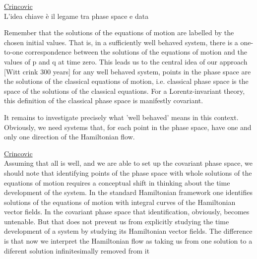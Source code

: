 \documentclass[Main]{subfiles}
\begin{document}
		\begin{Warning}
			\underline{Crincovic}\cite{Crnkovic1999}\\
			L'idea chiave è il legame tra phase space e data
			
			Remember that the solutions of the equations of motion are labelled by the chosen initial values. 
			That is, in a sufficiently well behaved system, there is a one-to-one correspondence between the solutions of the equations of motion and the values of p and q at time zero. 
			This leads us to the central idea of our approach [Witt crink 300 years] for any well behaved system, points in the phase space are the solutions of the classical equations of motion, i.e. classical phase space is the space of the solutions of the classical equations. For a Lorentz-invariant theory, this definition of the classical phase space is manifestly covariant.		
			
			It remains to investigate precisely what 'well behaved' means in this context.
			Obviously, we need systems that, for each point in the phase space, have one and only one direction of the Hamiltonian flow.
		\end{Warning}	
		
		\begin{Warning}
		\underline{Crincovic}\cite{Crnkovic1999}\\
		Assuming that all is well, and we are able to set up the covariant phase space, we should note that identifying points of the phase space with whole solutions of the equations of motion requires a conceptual shift in thinking about the time development of the system.
		In the standard Hamiltonian framework one identifies solutions of the equations of motion with integral curves of the Hamiltonian vector fields. 
		In the covariant phase space that identification, obviously, becomes untenable. But that does not prevent us from explicitly studying the time development of a system by studying its Hamiltonian vector fields. 
		The difference is that now we interpret the Hamiltonian flow as taking us from one solution to a diferent solution infinitesimally removed from it	
		\end{Warning}
\end{document}
